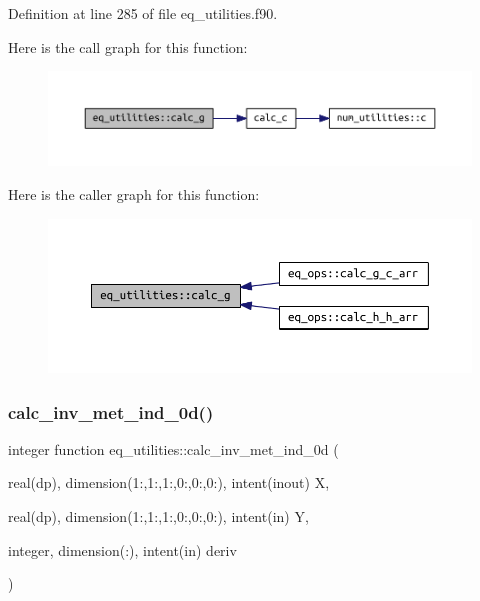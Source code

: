 Definition at line 285 of file eq\+\_\+utilities.\+f90.

Here is the call graph for this function\+:
\nopagebreak
\begin{figure}[H]
\begin{center}
\leavevmode
\includegraphics[width=350pt]{namespaceeq__utilities_a1426f7226577f8719472265fd882fbf4_cgraph}
\end{center}
\end{figure}
Here is the caller graph for this function\+:
\nopagebreak
\begin{figure}[H]
\begin{center}
\leavevmode
\includegraphics[width=350pt]{namespaceeq__utilities_a1426f7226577f8719472265fd882fbf4_icgraph}
\end{center}
\end{figure}
\mbox{\label{namespaceeq__utilities_a2994002cd224e90f6bd71c926b09fee2}} 
\subsubsection{\texorpdfstring{calc\+\_\+inv\+\_\+met\+\_\+ind\+\_\+0d()}{calc\_inv\_met\_ind\_0d()}}
{\footnotesize\ttfamily integer function eq\+\_\+utilities\+::calc\+\_\+inv\+\_\+met\+\_\+ind\+\_\+0d (\begin{DoxyParamCaption}\item[{real(dp), dimension(1\+:,1\+:,1\+:,0\+:,0\+:,0\+:), intent(inout)}]{X,  }\item[{real(dp), dimension(1\+:,1\+:,1\+:,0\+:,0\+:,0\+:), intent(in)}]{Y,  }\item[{integer, dimension(\+:), intent(in)}]{deriv }\end{DoxyParamCaption})}



